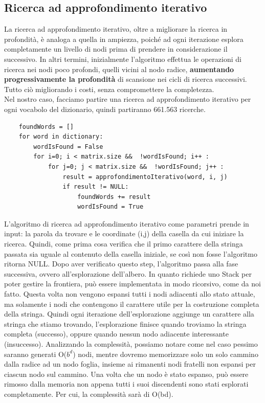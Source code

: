 \documentclass[10pt,a4paper]{article}
\begin{document}
	\subsection{Ricerca ad approfondimento iterativo}
	La ricerca ad approfondimento iterativo, oltre a migliorare la ricerca in profondità, è analoga a quella in ampiezza, poiché ad ogni iterazione esplora completamente un livello di nodi prima di prendere in considerazione il successivo. In altri termini, inizialmente l'algoritmo effettua le operazioni di ricerca nei nodi poco profondi, quelli vicini al nodo radice, \textbf{aumentando progressivamente la profondità} di scansione nei cicli di ricerca successivi. Tutto ciò migliorando i costi, senza compromettere la completezza.\\
	Nel nostro caso, facciamo partire una ricerca ad approfondimento iterativo per ogni vocabolo del dizionario, quindi partiranno 661.563 ricerche.
	\begin{lstlisting}
	foundWords = []
	for word in dictionary:
		wordIsFound = False
		for i=0; i < matrix.size &&  !wordIsFound; i++ :
			for j=0; j < matrix.size &&  !wordIsFound; j++ :
				result = approfondimentoIterativo(word, i, j)
				if result != NULL:
					foundWords += result
					wordIsFound = True
	\end{lstlisting}
	L'algoritmo di ricerca ad approfondimento iterativo come parametri prende in input: la parola da trovare e le coordinate (i,j) della casella da cui iniziare la ricerca. Quindi, come prima cosa verifica che il primo carattere della stringa passata sia uguale al contenuto della casella iniziale, se così non fosse l'algoritmo ritorna NULL.
	Dopo aver verificato questo step, l'algoritmo passa alla fase successiva, ovvero all'esplorazione dell'albero. In quanto richiede uno Stack per poter gestire la frontiera, può essere implementata in modo ricorsivo, come da noi fatto. Questa volta non vengono espansi tutti i nodi adiacenti allo stato attuale, ma solamente i nodi che contengono il carattere utile per la costruzione completa della stringa. Quindi ogni iterazione dell'esplorazione aggiunge un carattere alla stringa che stiamo trovando, l'esplorazione finisce quando troviamo la stringa completa (successo), oppure quando nessun nodo adiacente interessante (insuccesso).
	Analizzando la complessità, possiamo notare come nel caso pessimo saranno generati O($b^d$) nodi, mentre dovremo memorizzare solo un solo cammino dalla radice ad un nodo foglia, insieme ai rimanenti nodi fratelli non espansi per ciascun nodo sul cammino. Una volta che un nodo è stato espanso, può essere rimosso dalla memoria non appena tutti i suoi discendenti	sono stati esplorati completamente. Per cui, la complessità sarà di O(bd).
\end{document}
